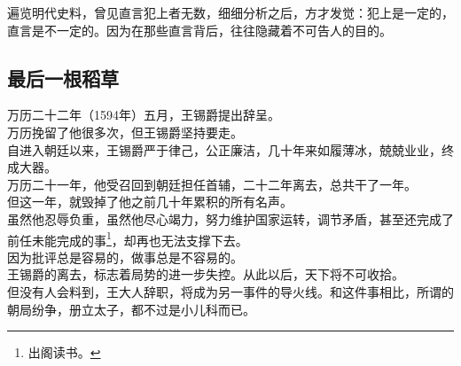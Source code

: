 \begin{multicols}{\theparacolNo}
遍览明代史料，曾见直言犯上者无数，细细分析之后，方才发觉：犯上是一定的，直言是不一定的。因为在那些直言背后，往往隐藏着不可告人的目的。\\

\subsection{最后一根稻草}
万历二十二年（1594年）五月，王锡爵提出辞呈。\\

万历挽留了他很多次，但王锡爵坚持要走。\\

自进入朝廷以来，王锡爵严于律己，公正廉洁，几十年来如履薄冰，兢兢业业，终成大器。\\

万历二十一年，他受召回到朝廷担任首辅，二十二年离去，总共干了一年。\\

但这一年，就毁掉了他之前几十年累积的所有名声。\\

虽然他忍辱负重，虽然他尽心竭力，努力维护国家运转，调节矛盾，甚至还完成了前任未能完成的事\footnote{出阁读书。}，却再也无法支撑下去。\\

因为批评总是容易的，做事总是不容易的。\\

王锡爵的离去，标志着局势的进一步失控。从此以后，天下将不可收拾。\\

但没有人会料到，王大人辞职，将成为另一事件的导火线。和这件事相比，所谓的朝局纷争，册立太子，都不过是小儿科而已。\\
\ifnum{}
	\end{multicols}
\fi
\newpage
